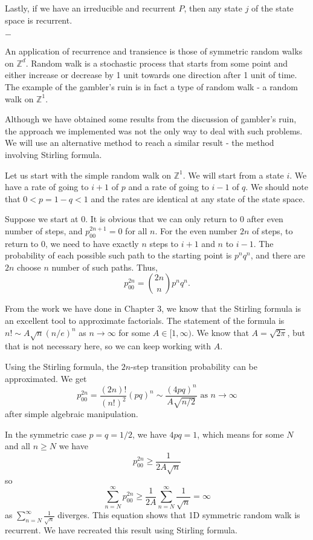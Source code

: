 \documentclass[11pt, a4paper, oneside]{book}
\theoremstyle{definition}
\def\Z{\mathbb{Z}}
\newcommand{\breaking}{%
    \begin{center}
    $-$
    \end{center}%
}
\begin{document}
\noindent Lastly, if we have an irreducible and recurrent $P$, then any state $j$ of the state space is recurrent. 

\breaking

\noindent An application of recurrence and transience is those of symmetric random walks on $\Z^d$. Random walk is a stochastic process that starts from some point and either increase or decrease by 1 unit towards one direction after 1 unit of time. The example of the gambler's ruin is in fact a type of random walk - a random walk on $\Z^1$. 

\noindent Although we have obtained some results from the discussion of gambler's ruin, the approach we implemented was not the only way to deal with such problems. We will use an alternative method to reach a similar result - the method involving Stirling formula. 

\noindent Let us start with the simple random walk on $\Z^1$. We will start from a state $i$. We have a rate of going to $i + 1$ of $p$ and a rate of going to $i - 1$ of $q$. We should note that $0 < p  = 1 - q < 1$ and the rates are identical at any state of the state space. 

\noindent Suppose we start at 0. It is obvious that we can only return to 0 after even number of steps, and $p_{00}^{2n+1} = 0$ for all $n$. For the even number $2n$ of steps, to return to 0, we need to have exactly $n$ steps to $i + 1$ and $n$ to $i -1$. The probability of each possible such path to the starting point is $p^n q^n$, and there are $2n$ choose $n$ number of such paths. Thus,\[
p_{00}^{2n} = \binom{2n}{n} p^n q^n.
\] 

\noindent From the work we have done in Chapter 3, we know that the Stirling formula is an excellent tool to approximate factorials. The statement of the formula is $n! \sim A\sqrt{n}(n/e)^n$ as $n \to \infty$ for some $A \in [1, \infty)$. We know that $A = \sqrt{2\pi}$, but that is not necessary here, so we can keep working with $A$. 

\noindent Using the Stirling formula, the $2n$-step transition probability can be approximated. We get\[
p_{00}^{2n} = \frac{(2n)!}{(n!)^2} (pq)^n \sim \frac{(4pq)^n}{A\sqrt{n/2}} \text{ as } n \to \infty
\]  
after simple algebraic manipulation. 

\noindent In the symmetric case $p = q = 1/2$, we have $4pq = 1$, which means for some $N$ and all $n \ge N$ we have \[
p_{00}^{2n} \ge \frac{1}{2A\sqrt{n}}
\]
so \[
\sum_{n=N}^{\infty} p_{00}^{2n} \ge \frac{1}{2A} \sum_{n=N}^{\infty} \frac{1}{\sqrt{n}} = \infty
\]
as $\sum_{n=N}^{\infty} \frac{1}{\sqrt{n}}$ diverges. This equation shows that 1D symmetric random walk is recurrent. We have recreated this result using Stirling formula. 
\end{document}
